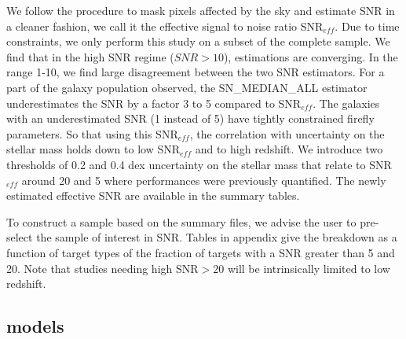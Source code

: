 \documentclass[onecolumn]{aa}
\begin{document}
We follow the \citet{2013AJ....145...69L} procedure to mask pixels affected by the sky and estimate SNR in a cleaner fashion, we call it the effective signal to noise ratio SNR$_{eff}$. 
Due to time constraints, we only perform this study on a subset of the complete sample. 
We find that in the high SNR regime ($SNR>10$), estimations are converging. 
In the range 1-10, we find large disagreement between the two SNR estimators. 
For a part of the galaxy population observed, the SN\_MEDIAN\_ALL estimator underestimates the SNR by a factor 3 to 5 compared to SNR$_{eff}$. 
The galaxies with an underestimated SNR (1 instead of 5) have tightly constrained firefly parameters. 
So that using this SNR$_{eff}$, the correlation with uncertainty on the stellar mass holds down to low SNR$_{eff}$ and to high redshift. 
We introduce two thresholds of 0.2 and 0.4 dex uncertainty on the stellar mass that relate to SNR$_{eff}$ around 20 and 5 where performances were previously quantified. The newly estimated effective SNR are available in the summary tables.

To construct a sample based on the summary files, we advise the user to pre-select the sample of interest in SNR. Tables in appendix give the breakdown as a function of target types of the fraction of targets with a SNR greater than 5 and 20. Note that studies needing high SNR$>20$ will be intrinsically limited to low redshift.

\subsection{\citet{Maraston_2011} models}
\end{document}
